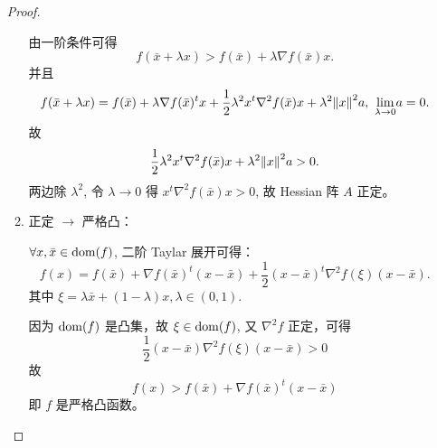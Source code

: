 \begin{Problem}
\begin{enumerate}
\begin{proof}
\begin{enumerate}
                由一阶条件可得 
                \[
                    f(\bar{x} + \lambda x) > f(\bar{x}) + \lambda \nabla f(\bar{x})x.
                \] 
                并且
                \[
                    f(\bar{x} + \lambda x) = f(\bar{x}) + \lambda \nabla f(\bar{x})^tx + \frac{1}{2}\lambda^2 x^t\nabla^2f(\bar{x})x + \lambda^2\norm{x}^2a,\ \underset{\lambda \to 0}{\lim} a = 0.
                \] 
                故 
                \[
                    \frac{1}{2}\lambda^2 x^t\nabla^2f(\bar{x})x + \lambda^2\norm{x}^2a > 0.
                \] 
                两边除 $\lambda^2$, 令 $\lambda \to 0$ 得 $x^t\nabla^2f(\bar{x})x > 0$, 故 Hessian 阵 $A$ 正定。
                \item 正定 $\to$ 严格凸：
                
                $\forall x, \bar{x} \in \operatorname{dom}(f)$, 二阶 Taylar 展开可得：
                \[
                    f(x) = f(\bar{x}) + \nabla f(\bar{x})^t(x - \bar{x}) + \frac{1}{2}(x - \bar{x})^t\nabla^2f(\xi)(x - \bar{x}).
                \]
                其中 $\xi = \lambda \bar{x} + (1 - \lambda)x, \lambda \in (0, 1).$

                因为 $\operatorname{dom}(f)$ 是凸集，故 $\xi \in \operatorname{dom}(f)$, 又 $\nabla^2f$ 正定，可得 
                \[
                    \frac{1}{2}(x - \bar{x})\nabla^2f(\xi)(x - \bar{x}) > 0
                \]
                故 
                \[
                    f(x) > f(\bar{x}) + \nabla f(\bar{x})^t(x - \bar{x})
                \]
                即 $f$ 是严格凸函数。
            \end{enumerate}
        \end{proof}
    \end{enumerate}
\end{Problem}


